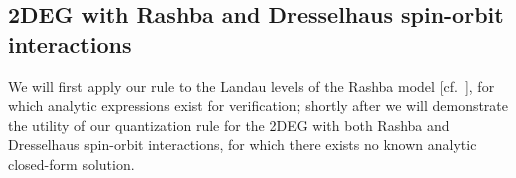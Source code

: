 \documentclass[aps, prb, showpacs, twocolumn, notitlepage, superscriptaddress]{revtex4-1}
\begin{document}




\subsection{2DEG with Rashba and Dresselhaus spin-orbit interactions}\label{sec:Rashba}



We will first apply our rule to the Landau levels of the Rashba model [cf.\ ], for which analytic expressions exist for verification; shortly after we will demonstrate the utility of our quantization rule for the 2DEG with both Rashba and Dresselhaus spin-orbit interactions, for which there exists no known analytic closed-form solution. 
\end{document}
